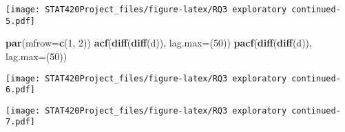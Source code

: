 \documentclass[]{article}
\newenvironment{Shaded}{\begin{snugshade}}{\end{snugshade}}
\newcommand{\CommentTok}[1]{\textcolor[rgb]{0.56,0.35,0.01}{\textit{#1}}}
\newcommand{\DataTypeTok}[1]{\textcolor[rgb]{0.13,0.29,0.53}{#1}}
\newcommand{\DecValTok}[1]{\textcolor[rgb]{0.00,0.00,0.81}{#1}}
\newcommand{\KeywordTok}[1]{\textcolor[rgb]{0.13,0.29,0.53}{\textbf{#1}}}
\newcommand{\NormalTok}[1]{#1}
\newcommand{\OperatorTok}[1]{\textcolor[rgb]{0.81,0.36,0.00}{\textbf{#1}}}
\newcommand{\StringTok}[1]{\textcolor[rgb]{0.31,0.60,0.02}{#1}}
\begin{document}
\texttt{[image: STAT420Project\_files/figure-latex/RQ3 exploratory continued-5.pdf]}

\begin{Shaded}
\begin{Highlighting}[]
\KeywordTok{par}\NormalTok{(}\DataTypeTok{mfrow=}\KeywordTok{c}\NormalTok{(}\DecValTok{1}\NormalTok{, }\DecValTok{2}\NormalTok{))}
\KeywordTok{acf}\NormalTok{(}\KeywordTok{diff}\NormalTok{(}\KeywordTok{diff}\NormalTok{(d)), }\DataTypeTok{lag.max=}\NormalTok{(}\DecValTok{50}\NormalTok{))}
\KeywordTok{pacf}\NormalTok{(}\KeywordTok{diff}\NormalTok{(}\KeywordTok{diff}\NormalTok{(d)),  }\DataTypeTok{lag.max=}\NormalTok{(}\DecValTok{50}\NormalTok{))}
\end{Highlighting}
\end{Shaded}

\texttt{[image: STAT420Project\_files/figure-latex/RQ3 exploratory continued-6.pdf]}

\begin{Shaded}
\end{Shaded}

\texttt{[image: STAT420Project\_files/figure-latex/RQ3 exploratory continued-7.pdf]}

\begin{Shaded}
\end{Shaded}
\end{document}

